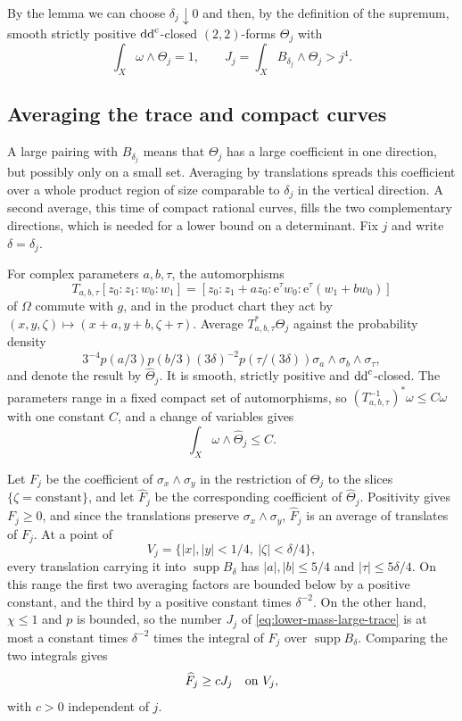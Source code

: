By the lemma we can choose $\delta_j\downarrow0$ and then, by the definition of the supremum, smooth strictly positive $\mathrm{dd}^{\mathrm{c}}$-closed $(2,2)$-forms $\Theta_j$ with
\begin{equation}\label{eq:lower-mass-large-trace}
 \int_X\omega\wedge\Theta_j=1,\qquad
 J_j=\int_XB_{\delta_j}\wedge\Theta_j>j^4.
\end{equation}

\subsection{Averaging the trace and compact curves}

A large pairing with $B_{\delta_j}$ means that $\Theta_j$ has a large coefficient in one direction, but possibly only on a small set. Averaging by translations spreads this coefficient over a whole product region of size comparable to $\delta_j$ in the vertical direction. A second average, this time of compact rational curves, fills the two complementary directions, which is needed for a lower bound on a determinant. Fix $j$ and write $\delta=\delta_j$.

For complex parameters $a,b,\tau$, the automorphisms
\[
 T_{a,b,\tau}[z_0:z_1:w_0:w_1]
 =[z_0:z_1+az_0:\mathrm{e}^{\tau}w_0:
                  \mathrm{e}^{\tau}(w_1+bw_0)]
\]
of $\Omega$ commute with $g$, and in the product chart they act by
$(x,y,\zeta)\mapsto(x+a,y+b,\zeta+\tau)$.
Average $T_{a,b,\tau}^*\Theta_j$ against the probability density
\[
 3^{-4}p(a/3)p(b/3)(3\delta)^{-2}p(\tau/(3\delta))
       \sigma_a\wedge\sigma_b\wedge\sigma_\tau,
\]
and denote the result by $\widehat\Theta_j$. It is smooth, strictly positive and $\mathrm{dd}^{\mathrm{c}}$-closed. The parameters range in a fixed compact set of automorphisms, so $(T_{a,b,\tau}^{-1})^*\omega\leq C\omega$ with one constant $C$, and a change of variables gives
\begin{equation}\label{eq:lower-mass-averaged-degree}
 \int_X\omega\wedge\widehat\Theta_j\leq C.
\end{equation}

Let $F_j$ be the coefficient of $\sigma_x\wedge\sigma_y$ in the restriction of $\Theta_j$ to the slices $\{\zeta=\text{constant}\}$, and let $\widehat F_j$ be the corresponding coefficient of $\widehat\Theta_j$. Positivity gives $F_j\geq0$, and since the translations preserve $\sigma_x\wedge\sigma_y$, $\widehat F_j$ is an average of translates of $F_j$. At a point of
\[
 V_j=\{|x|,|y|<1/4,\ |\zeta|<\delta/4\},
\]
every translation carrying it into $\operatorname{supp}B_\delta$ has
$|a|,|b|\leq5/4$ and $|\tau|\leq5\delta/4$. On this range the first two averaging factors are bounded below by a positive constant, and the third by a positive constant times $\delta^{-2}$. On the other hand, $\chi\leq1$ and $p$ is bounded, so the number $J_j$ of \eqref{eq:lower-mass-large-trace} is at most a constant times $\delta^{-2}$ times the integral of $F_j$ over $\operatorname{supp}B_\delta$. Comparing the two integrals gives
\begin{equation}\label{eq:lower-mass-spread-trace}
 \widehat F_j\geq cJ_j\quad\hbox{on }V_j,
\end{equation}
with $c>0$ independent of $j$.

